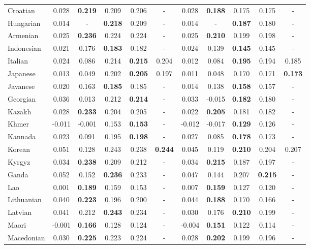 \begin{longtable}{lcccccccccc}
Croatian & 0.028 & \textbf{0.219} & 0.209 & 0.206 & - & 0.028 & \textbf{0.188} & 0.175 & 0.175 & - \\
Hungarian & 0.014 & - & \textbf{0.218} & 0.209 & - & 0.014 & - & \textbf{0.187} & 0.180 & - \\
Armenian & 0.025 & \textbf{0.236} & 0.224 & 0.224 & - & 0.025 & \textbf{0.210} & 0.199 & 0.198 & - \\
Indonesian & 0.021 & 0.176 & \textbf{0.183} & 0.182 & - & 0.024 & 0.139 & \textbf{0.145} & 0.145 & - \\
Italian & 0.024 & 0.086 & 0.214 & \textbf{0.215} & 0.204 & 0.012 & 0.084 & \textbf{0.195} & 0.194 & 0.185 \\
Japanese & 0.013 & 0.049 & 0.202 & \textbf{0.205} & 0.197 & 0.011 & 0.048 & 0.170 & 0.171 & \textbf{0.173} \\
Javanese & 0.020 & 0.163 & \textbf{0.185} & 0.185 & - & 0.014 & 0.138 & \textbf{0.158} & 0.157 & - \\
Georgian & 0.036 & 0.013 & 0.212 & \textbf{0.214} & - & 0.033 & -0.015 & \textbf{0.182} & 0.180 & - \\
Kazakh & 0.028 & \textbf{0.233} & 0.204 & 0.205 & - & 0.022 & \textbf{0.205} & 0.181 & 0.182 & - \\
Khmer & -0.011 & -0.001 & 0.153 & \textbf{0.153} & - & -0.012 & -0.017 & \textbf{0.129} & 0.126 & - \\
Kannada & 0.023 & 0.091 & 0.195 & \textbf{0.198} & - & 0.027 & 0.085 & \textbf{0.178} & 0.173 & - \\
Korean & 0.051 & 0.128 & 0.243 & 0.238 & \textbf{0.244} & 0.045 & 0.119 & \textbf{0.210} & 0.204 & 0.207 \\
Kyrgyz & 0.034 & \textbf{0.238} & 0.209 & 0.212 & - & 0.034 & \textbf{0.215} & 0.187 & 0.197 & - \\
Ganda & 0.052 & 0.152 & \textbf{0.236} & 0.233 & - & 0.047 & 0.144 & 0.207 & \textbf{0.215} & - \\
Lao & 0.001 & \textbf{0.189} & 0.159 & 0.153 & - & 0.007 & \textbf{0.159} & 0.127 & 0.120 & - \\
Lithuanian & 0.040 & \textbf{0.223} & 0.196 & 0.200 & - & 0.044 & \textbf{0.188} & 0.170 & 0.166 & - \\
Latvian & 0.041 & 0.212 & \textbf{0.243} & 0.234 & - & 0.030 & 0.176 & \textbf{0.210} & 0.199 & - \\
Maori & -0.001 & \textbf{0.166} & 0.128 & 0.124 & - & -0.004 & \textbf{0.151} & 0.122 & 0.114 & - \\
Macedonian & 0.030 & \textbf{0.225} & 0.223 & 0.224 & - & 0.028 & \textbf{0.202} & 0.199 & 0.196 & - \\

\end{longtable}
